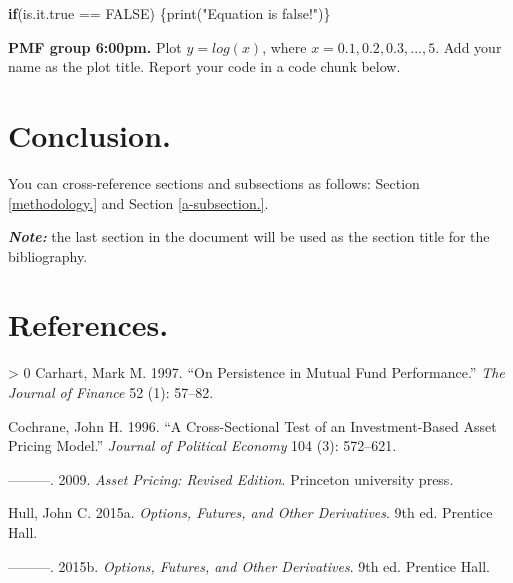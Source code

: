 \documentclass[12pt,halfline,a4paper,]{ouparticle}
\newenvironment{Shaded}{\begin{snugshade}}{\end{snugshade}}
\newcommand{\ConstantTok}[1]{\textcolor[rgb]{0.00,0.00,0.00}{#1}}
\newcommand{\ControlFlowTok}[1]{\textcolor[rgb]{0.13,0.29,0.53}{\textbf{#1}}}
\newcommand{\FunctionTok}[1]{\textcolor[rgb]{0.00,0.00,0.00}{#1}}
\newcommand{\NormalTok}[1]{#1}
\newcommand{\SpecialCharTok}[1]{\textcolor[rgb]{0.00,0.00,0.00}{#1}}
\newcommand{\StringTok}[1]{\textcolor[rgb]{0.31,0.60,0.02}{#1}}
\newlength{\cslhangindent}
\newenvironment{CSLReferences}[3] %
 {%
  \setlength{\parindent}{0pt}
  \ifodd #1 \everypar{\setlength{\hangindent}{\cslhangindent}}\ignorespaces\fi
  \ifnum #2 > 0
  \setlength{\parskip}{#2\baselineskip}
  \fi
 }%
 {}
\begin{document}
\begin{Shaded}
\begin{Highlighting}[]
\ControlFlowTok{if}\NormalTok{(is.it.true }\SpecialCharTok{==} \ConstantTok{FALSE}\NormalTok{) \{}\FunctionTok{print}\NormalTok{(}\StringTok{"Equation is false!"}\NormalTok{)\}}
\end{Highlighting}
\end{Shaded}

\textbf{PMF group 6:00pm.} Plot \(y=log(x)\), where
\(x=0.1, 0.2, 0.3,...,5\). Add your name as the plot title. Report your
code in a code chunk below.

\hypertarget{conclusion.}{%
\section{Conclusion.}\label{conclusion.}}

You can cross-reference sections and subsections as follows: Section
\ref{methodology.} and Section \ref{a-subsection.}.

\textbf{\emph{Note:}} the last section in the document will be used as
the section title for the bibliography.

\hypertarget{references.}{%
\section*{References.}\label{references.}}

\hypertarget{refs}{}
\begin{CSLReferences}{1}{0}
\leavevmode\hypertarget{ref-carhart1997persistence}{}%
Carhart, Mark M. 1997. {``On Persistence in Mutual Fund Performance.''}
\emph{The Journal of Finance} 52 (1): 57--82.

\leavevmode\hypertarget{ref-cochrane1996cross}{}%
Cochrane, John H. 1996. {``A Cross-Sectional Test of an Investment-Based
Asset Pricing Model.''} \emph{Journal of Political Economy} 104 (3):
572--621.

\leavevmode\hypertarget{ref-cochrane2009asset}{}%
---------. 2009. \emph{Asset Pricing: Revised Edition}. Princeton
university press.

\leavevmode\hypertarget{ref-Hull}{}%
Hull, John C. 2015a. \emph{Options, Futures, and Other Derivatives}. 9th
ed. Prentice Hall.

\leavevmode\hypertarget{ref-Hull2}{}%
---------. 2015b. \emph{Options, Futures, and Other Derivatives}. 9th
ed. Prentice Hall.

\end{CSLReferences}
\end{document}
